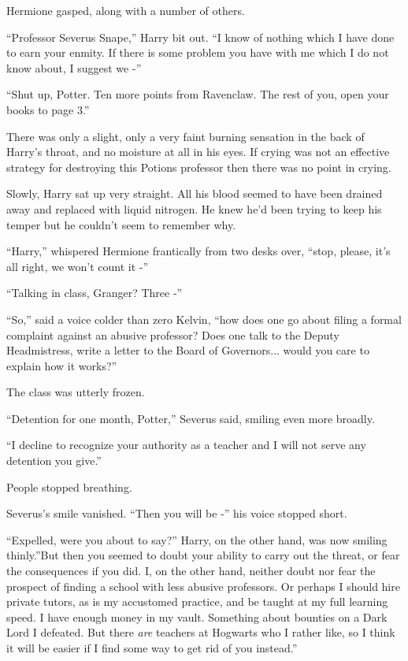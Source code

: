 Hermione gasped, along with a number of others.

``Professor Severus Snape,'' Harry bit out. ``I know of nothing which I
have done to earn your enmity. If there is some problem you have with me
which I do not know about, I suggest we -''

``Shut up, Potter. Ten more points from Ravenclaw. The rest of you, open
your books to page 3.''

There was only a slight, only a very faint burning sensation in the back
of Harry's throat, and no moisture at all in his eyes. If crying was not
an effective strategy for destroying this Potions professor then there
was no point in crying.

Slowly, Harry sat up very straight. All his blood seemed to have been
drained away and replaced with liquid nitrogen. He knew he'd been trying
to keep his temper but he couldn't seem to remember why.

``Harry,'' whispered Hermione frantically from two desks over, ``stop,
please, it's all right, we won't count it -''

``Talking in class, Granger? Three -''

``So,'' said a voice colder than zero Kelvin, ``how does one go about
filing a formal complaint against an abusive professor? Does one talk to
the Deputy Headmistress, write a letter to the Board of
Governors... would you care to explain how it works?''

The class was utterly frozen.

``Detention for one month, Potter,'' Severus said, smiling even more
broadly.

``I decline to recognize your authority as a teacher and I will not
serve any detention you give.''

People stopped breathing.

Severus's smile vanished. ``Then you will be -'' his voice stopped
short.

``Expelled, were you about to say?'' Harry, on the other hand, was now
smiling thinly.''But then you seemed to doubt your ability to carry out
the threat, or fear the consequences if you did. I, on the other hand,
neither doubt nor fear the prospect of finding a school with less
abusive professors. Or perhaps I should hire private tutors, as is my
accustomed practice, and be taught at my full learning speed. I have
enough money in my vault. Something about bounties on a Dark Lord I
defeated. But there \emph{are} teachers at Hogwarts who I rather like,
so I think it will be easier if I find some way to get rid of you
instead.''

